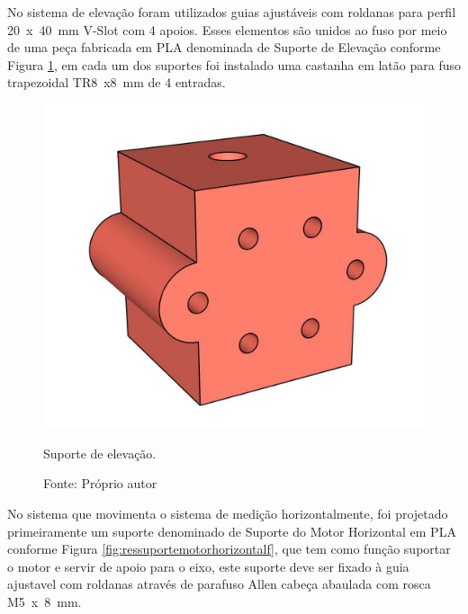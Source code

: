 \pagebreak

No sistema de elevação foram utilizados guias ajustáveis com roldanas para perfil 20~x~40~mm V-Slot 
com 4 apoios. Esses elementos são unidos ao fuso por meio de uma peça fabricada em \ac{PLA} 
denominada de Suporte de Elevação conforme Figura \ref{fig:ressuporteelevacao}, em cada um dos 
suportes foi instalado uma castanha em latão para fuso trapezoidal TR8~x8~mm de 4 entradas.

\begin{figure}[H]
\centering
\includegraphics[scale = 0.4]{figuras/ressuporteelevacao}
\caption{Suporte de elevação.}
\caption*{Fonte: Próprio autor}
\label{fig:ressuporteelevacao}
\end{figure}
        
\pagebreak

No sistema que movimenta o sistema de medição horizontalmente, foi projetado primeiramente 
um suporte denominado de Suporte do Motor Horizontal em \ac{PLA} conforme Figura \ref{fig:ressuportemotorhorizontalf}, 
que tem como função suportar o motor e servir de apoio para o eixo, este suporte deve ser fixado 
à guia ajustavel com roldanas através de parafuso Allen cabeça abaulada com rosca M5~x~8~mm.


